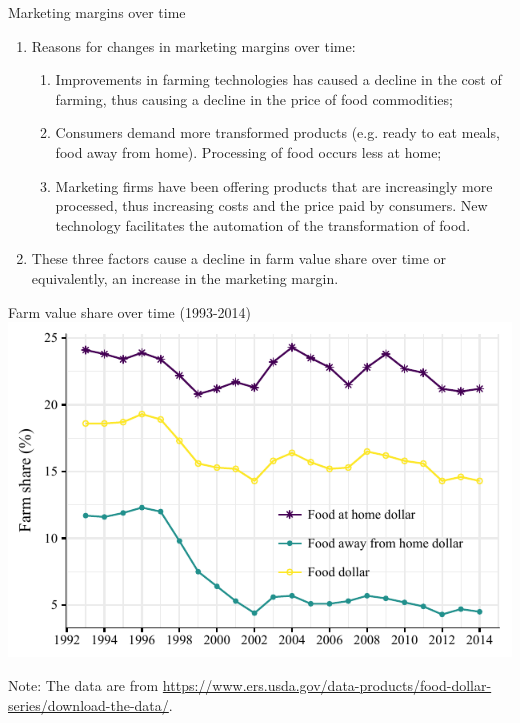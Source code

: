 \documentclass[table,xcolor=pdftex,dvipsnames, handout]{beamer}\usepackage[]{graphicx}\usepackage[]{color}
\makeatletter
\def\maxwidth{ %
  \ifdim\Gin@nat@width>\linewidth
    \linewidth
  \else
    \Gin@nat@width
  \fi
}
\newenvironment{knitrout}{}{} %
\makeatother
\begin{document}
\begin{frame}{Marketing margins over time}
\begin{enumerate}[label=\textbullet]
  \item Reasons for changes in marketing margins over time:
     \begin{enumerate}[label=\arabic*.]
        \item Improvements in farming technologies has caused a decline in the cost of farming, thus causing a decline in the price of food commodities;
        \item Consumers demand more transformed products (e.g. ready to eat meals, food away from home). Processing of food occurs less at home;
        \item Marketing firms have been offering products that are increasingly more processed, thus increasing costs and the price paid by consumers. New technology facilitates the automation of the transformation of food.
     \end{enumerate}
  \item These three factors cause a decline in farm value share over time or equivalently, an increase in the marketing margin.
\end{enumerate}
\end{frame}



\begin{frame}{Farm value share over time (1993-2014)}
\begin{knitrout}
\color{fgcolor}
\includegraphics[width=\maxwidth]{figure/figure_farm_share-1} 

\end{knitrout}
\scriptsize
Note: The data are from \url{https://www.ers.usda.gov/data-products/food-dollar-series/download-the-data/}.
\end{frame}
\end{document}
